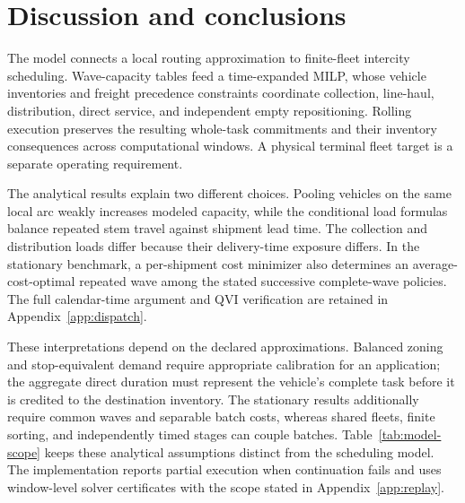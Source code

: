 \section{Discussion and conclusions}
\label{sec:discussion}

The model connects a local routing approximation to finite-fleet intercity
scheduling. Wave-capacity tables feed a time-expanded MILP, whose vehicle
inventories and freight precedence constraints coordinate collection,
line-haul, distribution, direct service, and independent empty repositioning.
Rolling execution preserves the resulting whole-task commitments and their
inventory consequences across computational windows. A physical terminal
fleet target is a separate operating requirement.

The analytical results explain two different choices. Pooling vehicles on
the same local arc weakly increases modeled capacity, while the conditional
load formulas balance repeated stem travel against shipment lead time.
The collection and distribution loads differ because their delivery-time
exposure differs. In the stationary benchmark, a per-shipment cost minimizer
also determines an average-cost-optimal repeated wave among the stated
successive complete-wave policies. The full calendar-time argument and QVI
verification are retained in Appendix~\ref{app:dispatch}.

These interpretations depend on the declared approximations. Balanced
zoning and stop-equivalent demand require appropriate calibration for an
application; the aggregate direct duration must represent the vehicle's
complete task before it is credited to the destination inventory. The
stationary results additionally require common waves and separable batch
costs, whereas shared fleets, finite sorting, and independently timed
stages can couple batches. Table~\ref{tab:model-scope} keeps these analytical
assumptions distinct from the scheduling model. The implementation reports
partial execution when continuation fails and uses window-level solver
certificates with the scope stated in Appendix~\ref{app:replay}.
